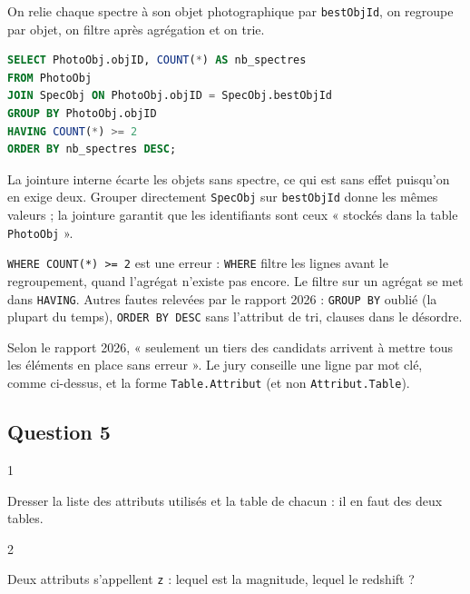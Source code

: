 \documentclass[11pt,a4paper]{article}
\begin{document}
On relie chaque spectre à son objet photographique par \texttt{bestObjId}, on regroupe par objet, on filtre après agrégation et on trie.

\begin{lstlisting}[language=SQL]
SELECT PhotoObj.objID, COUNT(*) AS nb_spectres
FROM PhotoObj
JOIN SpecObj ON PhotoObj.objID = SpecObj.bestObjId
GROUP BY PhotoObj.objID
HAVING COUNT(*) >= 2
ORDER BY nb_spectres DESC;
\end{lstlisting}

La jointure interne écarte les objets sans spectre, ce qui est sans effet puisqu'on en exige deux. Grouper directement \texttt{SpecObj} sur \texttt{bestObjId} donne les mêmes valeurs ; la jointure garantit que les identifiants sont ceux « stockés dans la table \texttt{PhotoObj} ».

\begin{piege}

\texttt{WHERE\ COUNT(\allowbreak{}*)\allowbreak{}\ \textgreater{}=\allowbreak{}\ 2} est une erreur : \texttt{WHERE} filtre les lignes avant le regroupement, quand l'agrégat n'existe pas encore. Le filtre sur un agrégat se met dans \texttt{HAVING}. Autres fautes relevées par le rapport 2026 : \texttt{GROUP\ BY} oublié (la plupart du temps), \texttt{ORDER\ BY\ DESC} sans l'attribut de tri, clauses dans le désordre.

\end{piege}

\begin{jury}

Selon le rapport 2026, « seulement un tiers des candidats arrivent à mettre tous les éléments en place sans erreur ». Le jury conseille une ligne par mot clé, comme ci-dessus, et la forme \texttt{Table.Attribut} (et non \texttt{Attribut.Table}).

\end{jury}

\hypertarget{question-5}{%
\subsection{Question 5}\label{question-5}}

\begin{indication}{1}

Dresser la liste des attributs utilisés et la table de chacun : il en faut des deux tables.

\end{indication}

\begin{indication}{2}

Deux attributs s'appellent \texttt{z} : lequel est la magnitude, lequel le redshift ?

\end{indication}
\end{document}
